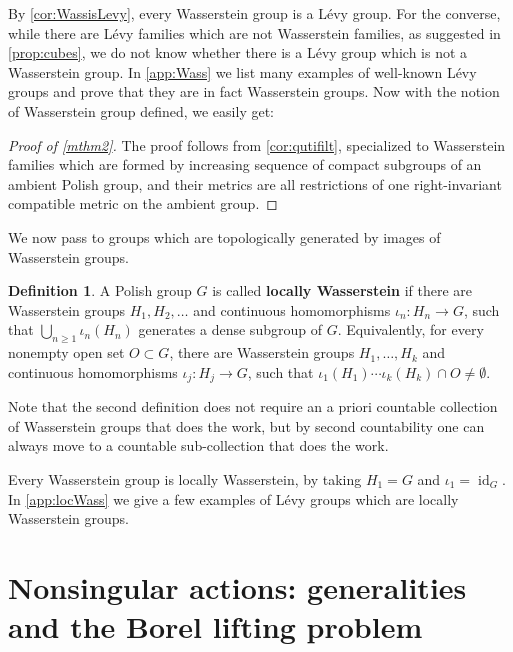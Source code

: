 \documentclass{amsart}
\providecommand{\definitionname}{Definition}
\numberwithin{equation}{subsection}
\theoremstyle{plain}
\theoremstyle{definition}
\newtheorem{defn}[defn]{\protect\definitionname}
\theoremstyle{plain}
\begin{document}
By \cref{cor:WassisLevy}, every Wasserstein group is a L\'{e}vy group. For the converse, while there are L\'{e}vy families which are not Wasserstein families, as suggested in \cref{prop:cubes}, we do not know whether there is a L\'{e}vy group which is not a Wasserstein group. In \cref{app:Wass} we list many examples of well-known L\'{e}vy groups and prove that they are in fact Wasserstein groups. Now with the notion of Wasserstein group defined, we easily get:

\begin{proof}[Proof of \cref{mthm2}]
The proof follows from \cref{cor:qutifilt}, specialized to Wasserstein families which are formed by increasing sequence of compact subgroups of an ambient Polish group, and their metrics are all restrictions of one right-invariant compatible metric on the ambient group.
\end{proof}

We now pass to groups which are topologically generated by images of Wasserstein groups.

\begin{defn}\label{def:appWass}
A Polish group \(G\) is called {\bf locally Wasserstein} if there are Wasserstein groups \(H_{1},H_{2},\dotsc\) and continuous homomorphisms \(\iota_{n}:H_{n}\to G\), such that \(\bigcup\nolimits_{n\geq1}\iota_{n}\left(H_{n}\right)\) generates a dense subgroup of \(G\). Equivalently, for every nonempty open set \(O\subset G\), there are Wasserstein groups \(H_{1},\dotsc,H_{k}\) and continuous homomorphisms \(\iota_{j}:H_{j}\to G\), such that \(\iota_{1}\left(H_{1}\right)\dotsm\iota_{k}\left(H_{k}\right)\cap O\neq\emptyset\).
\end{defn}

Note that the second definition does not require an a priori countable collection of Wasserstein groups that does the work, but by second countability one can always move to a countable sub-collection that does the work.

\smallskip

Every Wasserstein group is locally Wasserstein, by taking \(H_{1}=G\) and \(\iota_{1}=\operatorname{id}_{G}\). In \cref{app:locWass} we give a few examples of L\'{e}vy groups which are locally Wasserstein groups.

\section{Nonsingular actions: generalities and the Borel lifting problem}\label{sct:nonsingspat}
\end{document}
